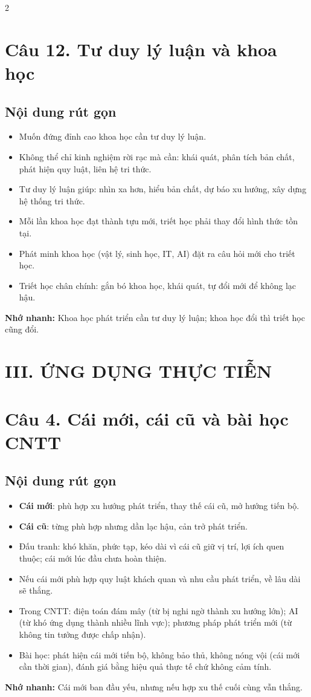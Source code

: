 \documentclass[9pt,a4paper]{extarticle}
\begin{document}
\begin{multicols*}{2}
\section*{Câu 12. Tư duy lý luận và khoa học}
\subsection*{Nội dung rút gọn}
\begin{itemize}
  \item Muốn đứng đỉnh cao khoa học cần tư duy lý luận.
  \item Không thể chỉ kinh nghiệm rời rạc mà cần: khái quát, phân tích bản chất, phát hiện quy luật, liên hệ tri thức.
  \item Tư duy lý luận giúp: nhìn xa hơn, hiểu bản chất, dự báo xu hướng, xây dựng hệ thống tri thức.
  \item Mỗi lần khoa học đạt thành tựu mới, triết học phải thay đổi hình thức tồn tại.
  \item Phát minh khoa học (vật lý, sinh học, IT, AI) đặt ra câu hỏi mới cho triết học.
  \item Triết học chân chính: gắn bó khoa học, khái quát, tự đổi mới để không lạc hậu.
\end{itemize}
\textbf{Nhớ nhanh:} Khoa học phát triển cần tư duy lý luận; khoa học đổi thì triết học cũng đổi.

\columnbreak

\section*{III. ỨNG DỤNG THỰC TIỄN}

\section*{Câu 4. Cái mới, cái cũ và bài học CNTT}
\subsection*{Nội dung rút gọn}
\begin{itemize}
  \item \textbf{Cái mới}: phù hợp xu hướng phát triển, thay thế cái cũ, mở hướng tiến bộ.
  \item \textbf{Cái cũ}: từng phù hợp nhưng dần lạc hậu, cản trở phát triển.
  \item Đấu tranh: khó khăn, phức tạp, kéo dài vì cái cũ giữ vị trí, lợi ích quen thuộc; cái mới lúc đầu chưa hoàn thiện.
  \item Nếu cái mới phù hợp quy luật khách quan và nhu cầu phát triển, về lâu dài sẽ thắng.
  \item Trong CNTT: điện toán đám mây (từ bị nghi ngờ thành xu hướng lớn); AI (từ khó ứng dụng thành nhiều lĩnh vực); phương pháp phát triển mới (từ không tin tưởng được chấp nhận).
  \item Bài học: phát hiện cái mới tiến bộ, không bảo thủ, không nóng vội (cái mới cần thời gian), đánh giá bằng hiệu quả thực tế chứ không cảm tính.
\end{itemize}
\textbf{Nhớ nhanh:} Cái mới ban đầu yếu, nhưng nếu hợp xu thế cuối cùng vẫn thắng.


\end{multicols*}
\end{document}
